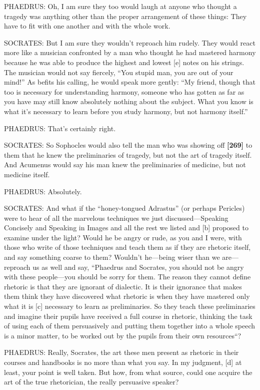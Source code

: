 PHAEDRUS: Oh, I am sure they too would laugh at anyone who thought a
tragedy was anything other than the proper arrangement of these things:
They have to fit with one another and with the whole work.

SOCRATES: But I am sure they wouldn't reproach him rudely. They would
react more like a musician confronted by a man who thought he had
mastered harmony because he was able to produce the highest and lowest
{[}e{]} notes on his strings. The musician would not say fiercely, “You
stupid man, you are out of your mind!” As befits his calling, he would
speak more gently: “My friend, though that too is necessary for
understanding harmony, someone who has gotten as far as you have may
still know absolutely nothing about the subject. What you know is what
it's necessary to learn before you study harmony, but not harmony
itself.”

PHAEDRUS: That's certainly right.

SOCRATES: So Sophocles would also tell the man who was showing off
{\bf {[}269{]}} to them that he knew the preliminaries of tragedy, but
not the art of tragedy itself. And Acumenus would say his man knew the
preliminaries of medicine, but not medicine itself.

PHAEDRUS: Absolutely.

SOCRATES: And what if the “honey-tongued Adrastus” (or perhaps
Pericles) were to hear
of all the marvelous techniques we just discussed---Speaking Concisely
and Speaking in Images and all the rest we listed and {[}b{]} proposed
to examine under the light? Would he be angry or rude, as you and I
were, with those who write of those techniques and teach them as if they
are rhetoric itself, and say something coarse to them? Wouldn't
he---being wiser than we are---reproach us as well and say, “Phaedrus
and Socrates, you should not be angry with these people---you should be
sorry for them. The reason they cannot define rhetoric is that they are
ignorant of dialectic. It is their ignorance that makes them think they
have discovered what rhetoric is when they have mastered only what it is
{[}c{]} necessary to learn as preliminaries. So they teach these
preliminaries and imagine their pupils have received a full course in
rhetoric, thinking the task of using each of them persuasively and
putting them together into a whole speech is a minor matter, to be
worked out by the pupils from their own resources“?

PHAEDRUS: Really, Socrates, the art these men present as rhetoric in
their courses and handbooks is no more than what you say. In my
judgment, {[}d{]} at least, your point is well taken. But how, from what
source, could one acquire the art of the true rhetorician, the really
persuasive speaker?

